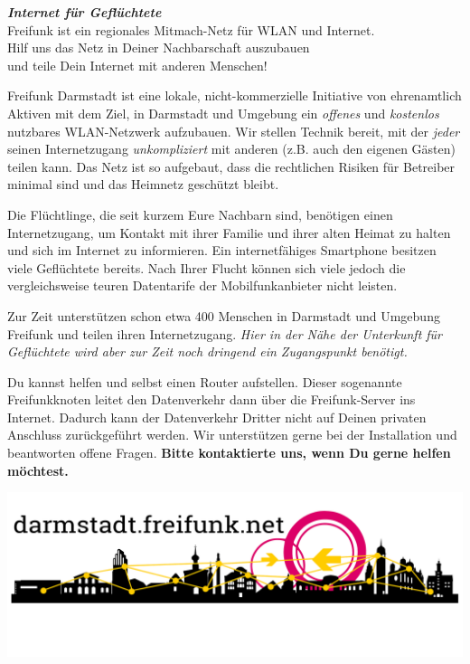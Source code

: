 \documentclass[a4paper]{article}
\begin{document}
\thispagestyle{empty}

\begin{center}
\Huge \textit{\textbf{\textcolor{freifunkpink}{Internet für Geflüchtete}}} \\
\vspace{0.6cm}
\large Freifunk ist ein regionales Mitmach-Netz für WLAN und Internet.\\
Hilf uns das Netz in Deiner Nachbarschaft auszubauen \\
und teile Dein Internet mit anderen Menschen!
\normalsize

\vspace{1.0cm}
\end{center}

{ }
\vspace{0.5cm}

Freifunk Darmstadt ist eine lokale, nicht-kommerzielle Initiative von ehrenamtlich Aktiven mit dem Ziel, in Darmstadt und Umgebung ein \emph{offenes} und \emph{kostenlos} nutzbares WLAN-Netzwerk aufzubauen. Wir stellen Technik bereit, mit der \emph{jeder} seinen Internetzugang \emph{unkompliziert} mit anderen (z.B. auch den eigenen Gästen) teilen kann. Das Netz ist so aufgebaut, dass die rechtlichen Risiken für Betreiber minimal sind und das Heimnetz geschützt bleibt.

Die Flüchtlinge, die seit kurzem Eure Nachbarn sind, benötigen einen Internetzugang, um Kontakt mit ihrer Familie und ihrer alten Heimat zu halten und sich im Internet zu informieren. Ein internetfähiges Smartphone besitzen viele Geflüchtete bereits. Nach Ihrer Flucht können sich viele jedoch die vergleichsweise teuren Datentarife der Mobilfunkanbieter nicht leisten.

Zur Zeit unterstützen schon etwa 400 Menschen in Darmstadt und Umgebung Freifunk und teilen ihren Internetzugang. \emph{Hier in der Nähe der Unterkunft für Geflüchtete wird aber zur Zeit noch dringend ein Zugangspunkt benötigt.}

Du kannst helfen und selbst einen Router aufstellen. Dieser sogenannte Freifunkknoten leitet den Datenverkehr dann über die Freifunk-Server ins Internet. Dadurch kann der Datenverkehr Dritter nicht auf Deinen privaten Anschluss zurückgeführt werden. Wir unterstützen gerne bei der Installation und beantworten offene Fragen. \textbf{Bitte kontaktierte uns, wenn Du gerne helfen möchtest.}

\vspace{0.67cm}
\hspace{-0.24cm}
\includegraphics[width=0.965\paperwidth]{../images/footer_dark}
\end{document}
